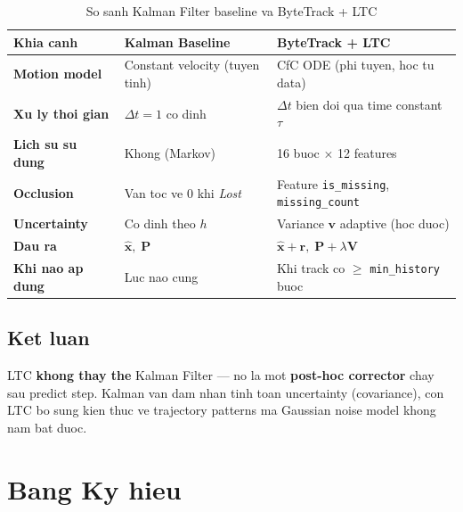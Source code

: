 \documentclass[12pt, a4paper]{article}
\newcommand{\mat}[1]{\mathbf{#1}}
\newcommand{\vect}[1]{\bm{#1}}
\begin{document}
\begin{table}[h!]
\centering
\renewcommand{\arraystretch}{1.6}
\begin{tabular}{>{\bfseries}p{3.2cm} p{5cm} p{5.5cm}}
  \toprule
  Khia canh & Kalman Baseline & ByteTrack + LTC \\
  \midrule
  Motion model
    & Constant velocity (tuyen tinh)
    & CfC ODE (phi tuyen, hoc tu data) \\
  Xu ly thoi gian
    & $\Delta t = 1$ co dinh
    & $\Delta t$ bien doi qua time constant $\tau$ \\
  Lich su su dung
    & Khong (Markov)
    & 16 buoc $\times$ 12 features \\
  Occlusion
    & Van toc ve 0 khi \textit{Lost}
    & Feature \texttt{is\_missing}, \texttt{missing\_count} \\
  Uncertainty
    & Co dinh theo $h$
    & Variance $\vect{v}$ adaptive (hoc duoc) \\
  Dau ra
    & $\hat{\vect{x}},\; \mat{P}$
    & $\hat{\vect{x}} + \vect{r},\; \mat{P} + \lambda\mat{V}$ \\
  Khi nao ap dung
    & Luc nao cung
    & Khi track co $\geq$ \texttt{min\_history} buoc \\
  \bottomrule
\end{tabular}
\caption{So sanh Kalman Filter baseline va ByteTrack + LTC}
\end{table}

\subsection{Ket luan}

\begin{notebox}
LTC \textbf{khong thay the} Kalman Filter --- no la mot \textbf{post-hoc corrector}
chay sau predict step. Kalman van dam nhan tinh toan uncertainty (covariance),
con LTC bo sung kien thuc ve trajectory patterns ma Gaussian noise model
khong nam bat duoc.
\end{notebox}

\section{Bang Ky hieu}
\end{document}

